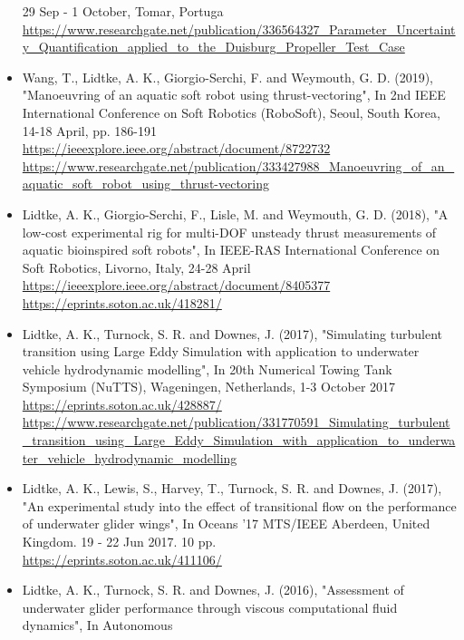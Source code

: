 \documentclass[a4paper,10pt]{article}
\begin{document}
\begin{itemize}
	29 Sep - 1 October, Tomar, Portuga
	\cite{Katsuno2019}
	\\ \url{https://www.researchgate.net/publication/336564327_Parameter_Uncertainty_Quantification_applied_to_the_Duisburg_Propeller_Test_Case}
%
\item Wang, T., Lidtke, A. K., Giorgio-Serchi, F. and Weymouth, G. D. (2019),
	"Manoeuvring of an aquatic soft robot using thrust-vectoring",
	In 2nd IEEE International Conference on Soft Robotics (RoboSoft),
	Seoul, South Korea, 14-18 April, pp. 186-191
	\cite{Wang2019}
	\\ \url{https://ieeexplore.ieee.org/abstract/document/8722732}
	\\ \url{https://www.researchgate.net/publication/333427988\_Manoeuvring\_of\_an\_aquatic\_soft\_robot\_using\_thrust-vectoring}
%
\item Lidtke, A. K., Giorgio-Serchi, F., Lisle, M. and Weymouth, G. D. (2018),
	"A low-cost experimental rig for multi-DOF unsteady thrust measurements of aquatic bioinspired soft robots",
	In IEEE-RAS International Conference on Soft Robotics, Livorno, Italy, 24-28 April
	\cite{Lidtke2018a}
	\\ \url{https://ieeexplore.ieee.org/abstract/document/8405377}
	\\ \url{https://eprints.soton.ac.uk/418281/}
%
\item Lidtke, A. K., Turnock, S. R. and Downes, J. (2017),
	"Simulating turbulent transition using Large Eddy Simulation with application to underwater vehicle hydrodynamic modelling",
	In 20th Numerical Towing Tank Symposium (NuTTS), Wageningen, Netherlands, 1-3 October 2017
	\cite{Lidtke2017a}
	\\ \url{https://eprints.soton.ac.uk/428887/}
	\\ \url{https://www.researchgate.net/publication/331770591\_Simulating\_turbulent\_transition\_using\_Large\_Eddy\_Simulation\_with\_application\_to\_underwater\_vehicle\_hydrodynamic\_modelling}
%
\item Lidtke, A. K., Lewis, S., Harvey, T., Turnock, S. R. and Downes, J. (2017),
	"An experimental study into the effect of transitional flow on the performance
	of underwater glider wings", In Oceans '17 MTS/IEEE Aberdeen, United Kingdom.
	19 - 22 Jun 2017. 10 pp.
	\cite{Lidtke2017b}
	\\ \url{https://eprints.soton.ac.uk/411106/}
%
\item Lidtke, A. K., Turnock, S. R. and Downes, J. (2016), "Assessment of underwater
	glider performance through viscous computational fluid dynamics", In Autonomous

\end{itemize}
\end{document}
